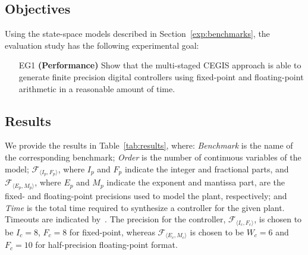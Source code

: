 \subsection{Objectives}
\label{exp:objectives}

Using the state-space models described in Section~\ref{exp:benchmarks}, 
the evaluation study has the following experimental goal: 

\begin{enumerate}

\item[EG1] \textbf{(Performance)} Show that the multi-staged 
CEGIS approach is able to generate finite precision digital controllers using fixed-point and floating-point arithmetic in a reasonable amount of time.


\end{enumerate}

\subsection{Results}
\label{exp:results}

We provide the results in Table~\ref{tab:results}, where: 
\textit{Benchmark} is the name of the corresponding benchmark; 
\textit{Order} is the number of continuous variables of the model; 
$\mathcal{F}_{\langle I_p,F_p \rangle}$, where $I_p$ and $F_p$ indicate the integer and fractional parts,  
and $\mathcal{F}_{\langle E_p,M_p \rangle}$, where $E_p$ and $M_p$ indicate the exponent and mantissa part, 
are the fixed- and floating-point precisions used to model the plant, respectively; 
and \textit{Time} is the total time required to synthesize a controller for the given plant.    
Timeouts are indicated by~\xmark.  
The precision for the controller, $\mathcal{F}_{\langle I_c,F_c \rangle}$, is
chosen to be $I_c = 8$, $F_c = 8$ for fixed-point, whereas  
$\mathcal{F}_{\langle E_c, M_c \rangle}$ is chosen to be $W_c = 6$ and $F_c = 10$
for half-precision floating-point format.

